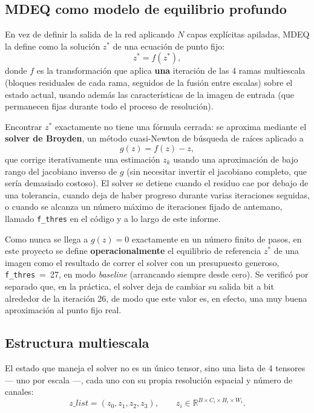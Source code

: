 \documentclass[11pt,a4paper]{article}
\newcommand{\code}[1]{\texttt{#1}}
\begin{document}
\subsection{MDEQ como modelo de equilibrio profundo}

En vez de definir la salida de la red aplicando $N$ capas explícitas apiladas, MDEQ la define como
la solución $z^*$ de una ecuación de punto fijo:
\begin{equation}
  z^* = f(z^*),
  \label{eq:punto-fijo}
\end{equation}
donde $f$ es la transformación que aplica \textbf{una} iteración de las 4 ramas multiescala
(bloques residuales de cada rama, seguidos de la fusión entre escalas) sobre el estado actual,
usando además las características de la imagen de entrada (que permanecen fijas durante todo el
proceso de resolución).

Encontrar $z^*$ exactamente no tiene una fórmula cerrada: se aproxima mediante el \textbf{solver de
Broyden}, un método cuasi-Newton de búsqueda de raíces aplicado a
\begin{equation}
  g(z) = f(z) - z,
  \label{eq:residuo}
\end{equation}
que corrige iterativamente una estimación $z_k$ usando una aproximación de bajo rango del
jacobiano inverso de $g$ (sin necesitar invertir el jacobiano completo, que sería demasiado
costoso). El solver se detiene cuando el residuo cae por debajo de una tolerancia, cuando deja de
haber progreso durante varias iteraciones seguidas, o cuando se alcanza un número máximo de
iteraciones fijado de antemano, llamado \code{f\_thres} en el código y a lo largo de este informe.

Como nunca se llega a $g(z)=0$ exactamente en un número finito de pasos, en este proyecto se define
\textbf{operacionalmente} el equilibrio de referencia $z^*$ de una imagen como el resultado de
correr el solver con un presupuesto generoso, \code{f\_thres}~=~27, en modo \emph{baseline}
(arrancando siempre desde cero). Se verificó por separado que, en la práctica, el solver deja de
cambiar su salida bit a bit alrededor de la iteración 26, de modo que este valor es, en efecto, una
muy buena aproximación al punto fijo real.

\subsection{Estructura multiescala}
\label{sec:estructura-multiescala}

El estado que maneja el solver no es un único tensor, sino una lista de 4 tensores --- uno por
escala ---, cada uno con su propia resolución espacial y número de canales:
\begin{equation}
  z\_list = (z_0, z_1, z_2, z_3), \qquad z_i \in \mathbb{R}^{B \times C_i \times H_i \times W_i}.
\end{equation}
\end{document}
